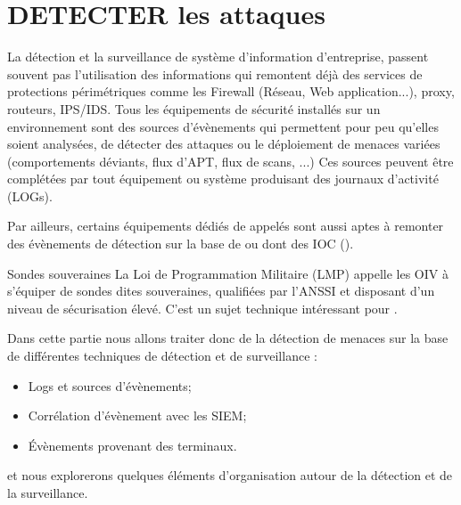 

\section{DETECTER les attaques}

La détection et la surveillance de système d'information d'entreprise, passent souvent pas l'utilisation des informations qui remontent déjà des services de protections périmétriques comme les Firewall (Réseau, Web application...),  proxy,  routeurs, IPS/IDS. Tous les équipements de sécurité installés sur un environnement sont des sources d'évènements qui permettent pour peu qu'elles soient analysées, de détecter des attaques ou le déploiement de menaces variées (comportements déviants, flux d'APT, flux de scans, ...)
Ces sources peuvent être complétées par tout équipement ou système  produisant des journaux d'activité (LOGs).

Par ailleurs, certains équipements dédiés de  appelés  sont aussi aptes à remonter des évènements de détection sur la base de  ou  dont des IOC ().

\begin{techworkbox}{Sondes souveraines}
La Loi de Programmation Militaire (LMP) appelle les OIV à s’équiper de sondes dites souveraines, qualifiées par l’ANSSI et  disposant d’un niveau de sécurisation élevé. C'est un sujet technique intéressant pour  \fichetech. 
\end{techworkbox}

Dans cette partie nous allons traiter donc de la détection de menaces sur la base  de différentes techniques de détection et de surveillance :

\begin{itemize}
  \item Logs et sources d'évènements; 
  \item Corrélation d'évènement avec les SIEM;
  \item Évènements provenant des terminaux.
\end{itemize}

et nous explorerons quelques éléments d'organisation autour de la détection et de la surveillance.

